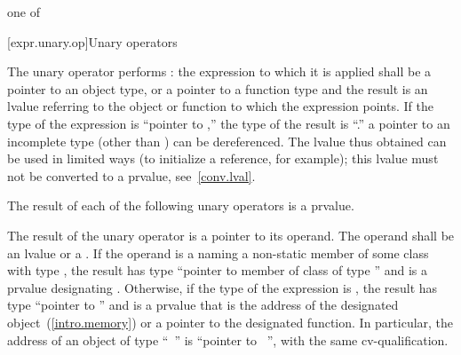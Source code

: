 %
%
%
%
%
%
%
%
%
%
%
%
%
%
%
\begin{bnf}
 \textnormal{one of}\br
    \terminal{*  \&  +  -  !  \tilde}
\end{bnf}

[expr.unary.op]{Unary operators}

\pnum
{}%
%
The unary \tcode{*} operator performs :
%
%
the expression to which it is applied shall be a pointer to an object
type, or a pointer to a function type and the result is an lvalue
referring to the object or function to which the expression points. If
the type of the expression is ``pointer to ,'' the type of the
result is ``.''
\enternote 
{}%
a pointer to an incomplete type (other than  )
can be dereferenced. The lvalue thus obtained can be used in limited
ways (to initialize a reference, for example); this lvalue must not be
converted to a prvalue, see~\ref{conv.lval}.
\exitnote 

\pnum
The result of each of the following unary operators is a prvalue.

\pnum
{}%
%
The result of the unary \tcode{\&} operator is a pointer to its operand.
The operand shall be an lvalue or a .
If the operand is a  naming a non-static member 
of some class  with type , the result has type ``pointer to member
of class  of type '' and is a prvalue designating .
Otherwise, if the type of the expression is , the result has type ``pointer to
'' and is a prvalue that is the address of the designated object~(\ref{intro.memory})
or a pointer to the designated function. \enternote In particular, the address of an
object of type ``\cv\ '' is ``pointer to \cv\ '', with the same
cv-qualification. \exitnote
\enterexample 


